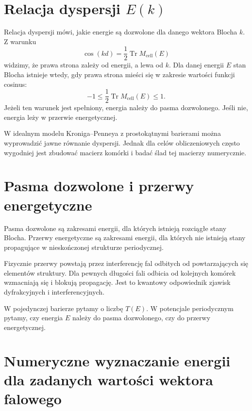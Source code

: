 \section{Relacja dyspersji \texorpdfstring{\(E(k)\)}{E(k)}}

Relacja dyspersji mówi, jakie energie są dozwolone dla danego wektora Blocha \(k\). Z warunku
\begin{equation}
    \cos(kd)=\frac{1}{2}\operatorname{Tr}M_{\mathrm{cell}}(E)
\end{equation}
widzimy, że prawa strona zależy od energii, a lewa od \(k\). Dla danej energii \(E\) stan Blocha istnieje wtedy, gdy prawa strona mieści się w zakresie wartości funkcji cosinus:
\begin{equation}
    -1\leq \frac{1}{2}\operatorname{Tr}M_{\mathrm{cell}}(E)\leq 1.
\end{equation}
Jeżeli ten warunek jest spełniony, energia należy do pasma dozwolonego. Jeśli nie, energia leży w przerwie energetycznej.

W idealnym modelu Kroniga--Penneya z prostokątnymi barierami można wyprowadzić jawne równanie dyspersji. Jednak dla celów obliczeniowych często wygodniej jest zbudować macierz komórki i badać ślad tej macierzy numerycznie.

\section{Pasma dozwolone i przerwy energetyczne}

Pasma dozwolone są zakresami energii, dla których istnieją rozciągłe stany Blocha. Przerwy energetyczne są zakresami energii, dla których nie istnieją stany propagujące w nieskończonej strukturze periodycznej.

Fizycznie przerwy powstają przez interferencję fal odbitych od powtarzających się elementów struktury. Dla pewnych długości fali odbicia od kolejnych komórek wzmacniają się i blokują propagację. Jest to kwantowy odpowiednik zjawisk dyfrakcyjnych i interferencyjnych.

\begin{summarybox}
W pojedynczej barierze pytamy o liczbę \(T(E)\). W potencjale periodycznym pytamy, czy energia \(E\) należy do pasma dozwolonego, czy do przerwy energetycznej.
\end{summarybox}

\section{Numeryczne wyznaczanie energii dla zadanych wartości wektora falowego}

